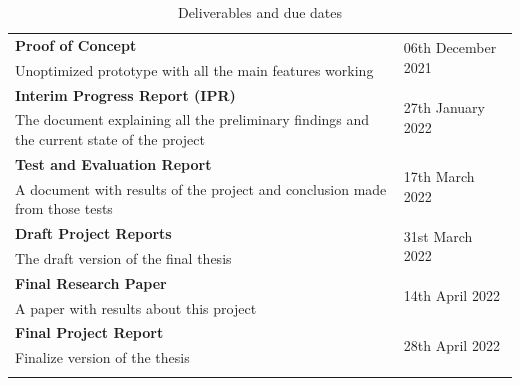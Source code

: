 \begin{longtable}{|p{115mm}|p{35mm}|}
\textbf{Proof of Concept} & \multirow{2}{*}{06th December 2021} \\
Unoptimized prototype with all the main features working &  \\ \hline
\textbf{Interim Progress Report (IPR)} & \multirow{2}{*}{27th January 2022} \\
The document explaining all the preliminary findings and the current state of the project &  \\ \hline
\textbf{Test and Evaluation Report} & \multirow{2}{*}{17th March 2022} \\
A document with results of the project and conclusion made from those tests &  \\ \hline
\textbf{Draft Project Reports} & \multirow{2}{*}{31st March 2022} \\
The draft version of the final thesis &  \\ \hline
\textbf{Final Research Paper} & \multirow{2}{*}{14th April 2022} \\
A paper with results about this project &  \\ \hline
\textbf{Final Project Report} & \multirow{2}{*}{28th April 2022} \\
Finalize version of the thesis &  \\ \hline
\caption{Deliverables and due dates}
\end{longtable}


\newpage
